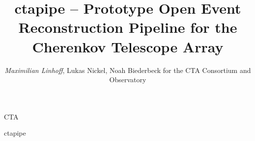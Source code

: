 \documentclass[aspectratio=1610, 9pt]{beamer}
\title{ctapipe -- Prototype Open Event Reconstruction Pipeline for the Cherenkov Telescope Array}
\author[M.~Linhoff]{\emph{Maximilian Linhoff}, Lukas Nickel, Noah Biederbeck for the CTA Consortium and Observatory}
\institute[TU Dortmund]{Astroparticle Physics}
\begin{document}
\maketitle

\begin{frame}{CTA}
\end{frame}

\begin{frame}{ctapipe}
\end{frame}

\begin{frame}
  
\end{frame}

\begin{frame}
  
\end{frame}
\end{document}
